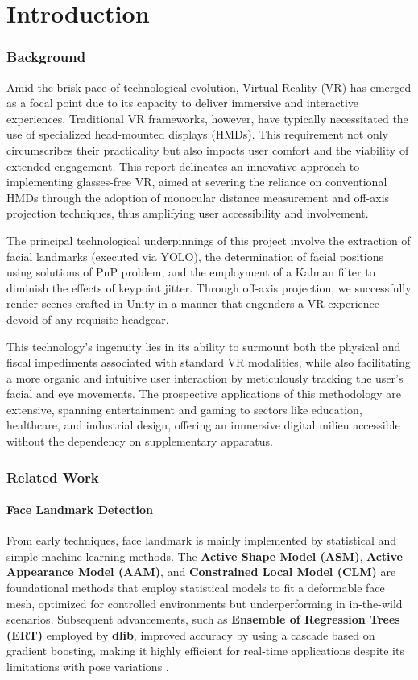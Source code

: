 \part{Introduction}

\section {Background}
Amid the brisk pace of technological evolution, Virtual Reality (VR) has emerged as a focal point due to its capacity to deliver immersive and interactive experiences. Traditional VR frameworks, however, have typically necessitated the use of specialized head-mounted displays (HMDs). This requirement not only circumscribes their practicality but also impacts user comfort and the viability of extended engagement. This report delineates an innovative approach to implementing glasses-free VR, aimed at severing the reliance on conventional HMDs through the adoption of monocular distance measurement and off-axis projection techniques, thus amplifying user accessibility and involvement.

The principal technological underpinnings of this project involve the extraction of facial  landmarks (executed via YOLO\cite{Redmon_2016_CVPR}), the determination of facial positions using solutions of PnP \cite{Wu_2006} problem, and the employment of a Kalman filter to diminish the effects of keypoint jitter. Through off-axis projection, we successfully render scenes crafted in Unity in a manner that engenders a VR experience devoid of any requisite headgear.

This technology's ingenuity lies in its ability to surmount both the physical and fiscal impediments associated with standard VR modalities, while also facilitating a more organic and intuitive user interaction by meticulously tracking the user’s facial and eye movements. The prospective applications of this methodology are extensive, spanning entertainment and gaming to sectors like education, healthcare, and industrial design, offering an immersive digital milieu accessible without the dependency on supplementary apparatus.

\section {Related Work}
\subsection{Face  Landmark Detection}
From early techniques, face landmark is mainly implemented by statistical and simple machine learning methods. The \textbf{Active Shape Model (ASM)}, \textbf{Active Appearance Model (AAM)}, and \textbf{Constrained Local Model (CLM)} \cite{WANG201850} \cite{Khabarlak_2022} are foundational methods that employ statistical models to fit a deformable face mesh, optimized for controlled environments but underperforming in in-the-wild scenarios. Subsequent advancements, such as \textbf{Ensemble of Regression Trees (ERT)} \cite{Kazemi_2014_CVPR} employed by \textbf{dlib}, improved accuracy by using a cascade based on gradient boosting, making it highly efficient for real-time applications despite its limitations with pose variations .

